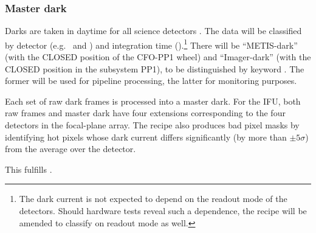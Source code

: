 \clearpage

\subsubsection{Master dark}
\label{sssec:metis_det_dark}
\label{rec:det_dark}
\label{rec:metis_det_dark}

Darks are taken in daytime for all science detectors
\cite{METIS-calibration_plan}. The data will be classified by detector
(e.g.~ and ) and integration time
().\footnote{The dark current is not expected to depend on the readout mode of the detectors. Should hardware tests reveal such a dependence, the recipe will be amended to classify on readout mode as well.} There will be ``METIS-dark''
(with the CLOSED position of the CFO-PP1 wheel) and ``Imager-dark''
(with the CLOSED position in the subsystem PP1), to be distinguished
by keyword \TBD. The former will be used for pipeline processing, the
latter for monitoring purposes.

Each set of raw dark frames is processed into a master dark. For the
IFU, both raw frames and master dark have four extensions
corresponding to the four detectors in the focal-plane array. The
recipe also produces bad pixel masks by identifying hot pixels whose
dark current differs significantly (by more than $\pm 5\sigma$) from
the average over the detector.

This fulfills .

